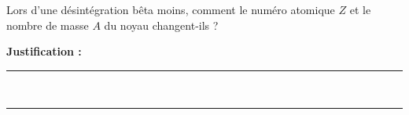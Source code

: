 Lors d'une désintégration bêta moins, comment le numéro atomique $Z$ et le nombre de masse $A$ du noyau changent-ils ?

\choices

\noindent\textbf{Justification :} \hrulefill \\[2.5ex]
\rule{\linewidth}{0.4pt} \\[2.5ex]
\rule{\linewidth}{0.4pt}
\vfill
